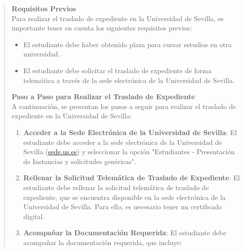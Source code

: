 \documentclass[12pt,a4paper,oneside]{report}
\begin{document}
\begin{itemize}
\begin{itemize}
\begin{quote}
\noindent\textbf{Requisitos Previos}\\

Para realizar el traslado de expediente en la Universidad de Sevilla, es importante tener en cuenta los siguientes requisitos previos:

\begin{itemize}
  \item El estudiante debe haber obtenido plaza para cursar estudios en otra universidad.
  \item El estudiante debe solicitar el traslado de expediente de forma telemática a través de la sede electrónica de la Universidad de Sevilla.
\end{itemize}


\noindent\textbf{Paso a Paso para Realizar el Traslado de Expediente}\\

A continuación, se presentan los pasos a seguir para realizar el traslado de expediente en la Universidad de Sevilla:

\begin{enumerate}
  \item \textbf{Acceder a la Sede Electrónica de la Universidad de Sevilla}: El estudiante debe acceder a la sede electrónica de la Universidad de Sevilla (\href{http://sede.us.es}{sede.us.es}) y seleccionar la opción "Estudiantes - Presentación de Instancias y solicitudes genéricas".
  \item \textbf{Rellenar la Solicitud Telemática de Traslado de Expediente}: El estudiante debe rellenar la solicitud telemática de traslado de expediente, que se encuentra disponible en la sede electrónica de la Universidad de Sevilla. Para ello, es necesario tener un certificado digital.
  \item \textbf{Acompañar la Documentación Requerida}: El estudiante debe acompañar la documentación requerida, que incluye:
\end{enumerate}


\end{quote}
\end{itemize}
\end{itemize}
\end{document}
